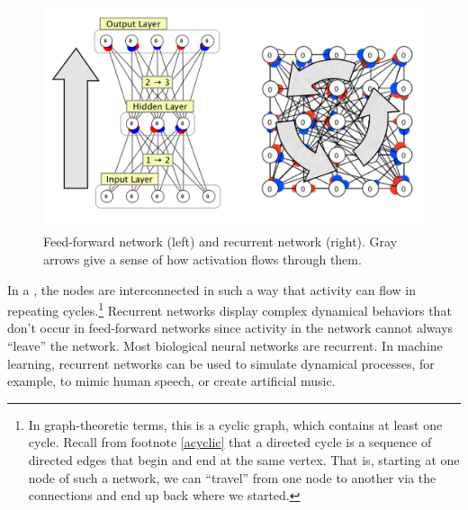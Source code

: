  
\begin{figure}[h]
\centering
\includegraphics[scale=.7]{./images/NeuralNetTypes.png}
\caption[Simbrain screenshots with additional elements added by Pamela Payne.]{Feed-forward network (left) and recurrent network (right). Gray arrows give a sense of how activation flows through them.}
\label{nn_types}
\end{figure}


In a , the nodes are interconnected in such a way that activity can flow in repeating cycles.\footnote{In graph-theoretic terms, this is a cyclic graph, which contains at least one cycle. Recall from footnote \ref{acyclic} that a directed cycle is a sequence of directed edges that begin and end at the same vertex. That is, starting at one node of such a network, we can ``travel'' from one node to another via the connections and end up back where we started.} Recurrent networks display complex dynamical behaviors that don't occur in feed-forward networks since activity in the network cannot always ``leave'' the network. Most biological neural networks are recurrent. In machine learning, recurrent networks can be used to simulate dynamical processes, for example,  to mimic human speech, or create artificial music.

